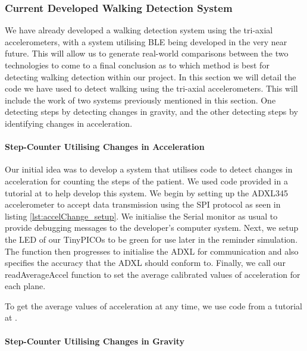 {\subsubsection{Current Developed Walking Detection System}

We have already developed a walking detection system using the tri-axial accelerometers, with a system utilising BLE being developed in the very near future. This will allow us to generate real-world comparisons between the two technologies to come to a final conclusion as to which method is best for detecting walking detection within our project. In this section we will detail the code we have used to detect walking using the tri-axial accelerometers. This will include the work of two systems previously mentioned in this section. One detecting steps by detecting changes in gravity, and the other detecting steps by identifying changes in acceleration. 

\paragraph{Step-Counter Utilising Changes in Acceleration}

Our initial idea was to develop a system that utilises code to detect changes in acceleration for counting the steps of the patient. We used code provided in a tutorial at \cite{agnihotri_2021} to help develop this system. We begin by setting up the ADXL345 accelerometer to accept data transmission using the SPI protocol as seen in listing \ref{lst:accelChange_setup}. We initialise the Serial monitor as usual to provide debugging messages to the developer's computer system. Next, we setup the LED of our TinyPICOs to be green for use later in the reminder simulation. The function then progresses to initialise the ADXL for communication and also specifies the accuracy that the ADXL should conform to. Finally, we call our readAverageAccel function to set the average calibrated values of acceleration for each plane.



To get the average values of acceleration at any time, we use code from a tutorial at \cite{agnihotri_2021}. 



\paragraph{Step-Counter Utilising Changes in Gravity}

}
